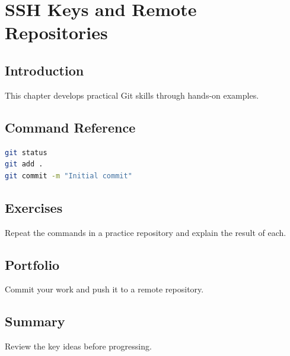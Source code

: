 \chapter{SSH Keys and Remote Repositories}
\label{chap:vol2-9}



\section{Introduction}
This chapter develops practical Git skills through hands-on examples.

\section{Command Reference}
\begin{lstlisting}[language=bash]
git status
git add .
git commit -m "Initial commit"
\end{lstlisting}

\section{Exercises}
\begin{exercise}
Repeat the commands in a practice repository and explain the result of each.
\end{exercise}

\section{Portfolio}
Commit your work and push it to a remote repository.

\section{Summary}
Review the key ideas before progressing.
